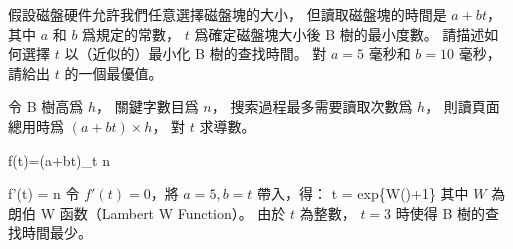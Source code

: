 \startEXERCISE
假設磁盤硬件允許我們任意選擇磁盤塊的大小，
但讀取磁盤塊的時間是 $a+bt$，
其中 $a$ 和 $b$ 爲規定的常數，
$t$ 爲確定磁盤塊大小後 B 樹的最小度數。
請描述如何選擇 $t$ 以（近似的）最小化 B 樹的查找時間。
對 $a=5$ 毫秒和 $b=10$ 毫秒，請給出 $t$ 的一個最優值。
\stopEXERCISE

\startANSWER
令 B 樹高爲 $h$，
關鍵字數目爲 $n$，
搜索過程最多需要讀取次數爲 $h$，
則讀頁面總用時爲 $(a+bt)\times h$，
對 $t$ 求導數。

\startformula
f(t)=(a+bt)\log_t n
\stopformula

\startformula
f'(t) = \cdot \ln n
\stopformula
令 $f'(t)=0$，將 $a=5,b=t$ 帶入，得：
\startformula
t = exp\left\{W()+1\right\}
\stopformula
其中 $W$ 為朗伯 W 函数（Lambert W Function）。
由於 $t$ 為整數， $t=3$ 時使得 B 樹的查找時間最少。
\stopANSWER